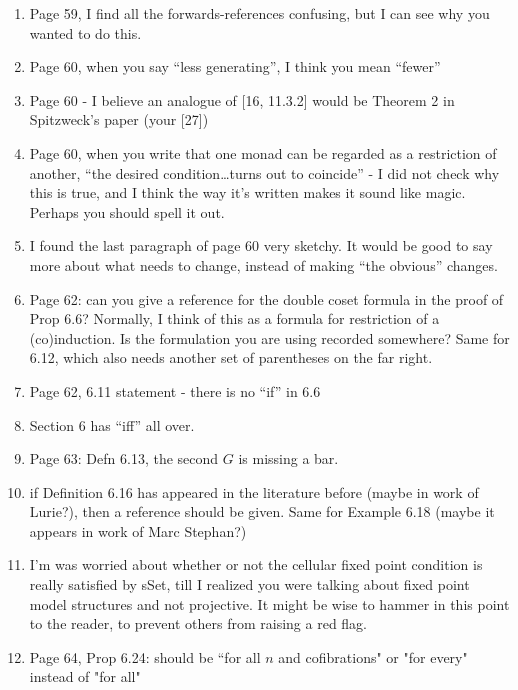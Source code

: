 \documentclass{article}
\begin{document}
\begin{enumerate}
\item
Page 59, I find all the forwards-references confusing, but I can see why you wanted to do this.

\item
Page 60, when you say ``less generating'', I think you mean ``fewer''

\item
Page 60 - I believe an analogue of [16, 11.3.2] would be Theorem 2 in Spitzweck's paper (your [27])

\item
Page 60, when you write that one monad can be regarded as a restriction of another, ``the desired condition\dots turns out to coincide'' - I did not check why this is true, and I think the way it's written makes it sound like magic. Perhaps you should spell it out.

\item
I found the last paragraph of page 60 very sketchy. It would be good to say more about what needs to change, instead of making ``the obvious'' changes.

\item
Page 62: can you give a reference for the double coset formula in the proof of Prop 6.6? Normally, I think of this as a formula for restriction of a (co)induction. Is the formulation you are using recorded somewhere?
Same for 6.12, which also needs another set of parentheses on the far right.

\item
Page 62, 6.11 statement - there is no ``if'' in 6.6

\item
Section 6 has ``iff'' all over.

\item
Page 63: Defn 6.13, the second $G$ is missing a bar.

\item if Definition 6.16 has appeared in the literature before (maybe in work of Lurie?), then a reference should be given. Same for Example 6.18 (maybe it appears in work of Marc Stephan?)

\item I'm was worried about whether or not the cellular fixed point condition is really satisfied by sSet, till I realized you were talking about fixed point model structures and not projective. It might be wise to hammer in this point to the reader, to prevent others from raising a red flag.

\item
Page 64, Prop 6.24: should be ``for all $n$ and cofibrations" or "for every" instead of "for all"


\end{enumerate}
\end{document}
